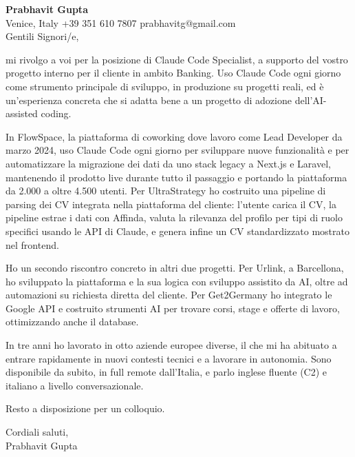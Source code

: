 \documentclass[a4paper,10.5pt]{article}
\begin{document}
\textbf{Prabhavit Gupta}\\
Venice, Italy \textbar{} +39 351 610 7807 \textbar{} prabhavitg@gmail.com\\[10pt]
Gentili Signori/e,

mi rivolgo a voi per la posizione di Claude Code Specialist, a supporto del vostro progetto interno per il cliente in ambito Banking. Uso Claude Code ogni giorno come strumento principale di sviluppo, in produzione su progetti reali, ed è un'esperienza concreta che si adatta bene a un progetto di adozione dell'AI-assisted coding.

In FlowSpace, la piattaforma di coworking dove lavoro come Lead Developer da marzo 2024, uso Claude Code ogni giorno per sviluppare nuove funzionalità e per automatizzare la migrazione dei dati da uno stack legacy a Next.js e Laravel, mantenendo il prodotto live durante tutto il passaggio e portando la piattaforma da 2.000 a oltre 4.500 utenti. Per UltraStrategy ho costruito una pipeline di parsing dei CV integrata nella piattaforma del cliente: l'utente carica il CV, la pipeline estrae i dati con Affinda, valuta la rilevanza del profilo per tipi di ruolo specifici usando le API di Claude, e genera infine un CV standardizzato mostrato nel frontend.

Ho un secondo riscontro concreto in altri due progetti. Per Urlink, a Barcellona, ho sviluppato la piattaforma e la sua logica con sviluppo assistito da AI, oltre ad automazioni su richiesta diretta del cliente. Per Get2Germany ho integrato le Google API e costruito strumenti AI per trovare corsi, stage e offerte di lavoro, ottimizzando anche il database.

In tre anni ho lavorato in otto aziende europee diverse, il che mi ha abituato a entrare rapidamente in nuovi contesti tecnici e a lavorare in autonomia. Sono disponibile da subito, in full remote dall'Italia, e parlo inglese fluente (C2) e italiano a livello conversazionale.

Resto a disposizione per un colloquio.

Cordiali saluti,\\
Prabhavit Gupta
\end{document}
